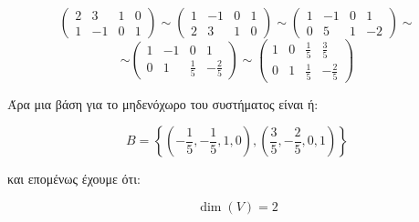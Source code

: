 \begin{enumerate}[1.]
\[
\begin{pmatrix}
2 & 3 & 1 & 0 \\
1 & -1 & 0 & 1 
\end{pmatrix}
\sim
\begin{pmatrix}
1 & -1 & 0 & 1 \\
2 & 3 & 1 & 0 
\end{pmatrix}
\sim 
\begin{pmatrix}
1 & -1 & 0 & 1 \\
0 & 5 & 1 & -2
\end{pmatrix}
\sim 
\]
\[
\sim
\begin{pmatrix}
1 & -1 & 0 & 1 \\
0 & 1 & \frac{1}{5} & -\frac{2}{5}
\end{pmatrix}
\sim 
\begin{pmatrix}
1 & 0 & \frac{1}{5} & \frac{3}{5} \\
0 & 1 & \frac{1}{5} & -\frac{2}{5}
\end{pmatrix}
\]

\end{enumerate}

Άρα μια βάση για το μηδενόχωρο του συστήματος είναι ή:

\[
Β=\left\{(-\frac{1}{5},-\frac{1}{5},1,0), (\frac{3}{5},-\frac{2}{5},0,1)\right\}
\]

και επομένως έχουμε ότι:

\[
\dim(V)=2
\]
